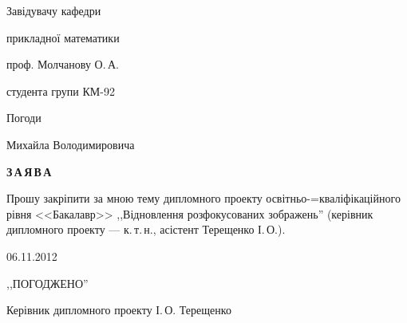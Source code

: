 \documentclass[a4paper,12pt,notitlepage,headsepline,pdftex]{scrartcl}
\begin{document}
\begin{titlepage}
  \hfill
  \begin{minipage}{0.4\textwidth}
    Завідувачу кафедри

    прикладної математики

    проф. Молчанову О.\,А.

    \vspace{0.3cm}

    студента групи КМ-92

    Погоди

    Михайла Володимировича
  \end{minipage}

  \vspace{3cm}
  \begin{center}
    \bf
    З\,А\,Я\,В\,А
  \end{center}

  \vspace{1cm}

  Прошу закріпити за мною тему дипломного проекту освітньо-=кваліфікаційного
  рівня <<Бакалавр>> ,,Відновлення розфокусованих зображень'' (керівник
  дипломного проекту --- к.\,т.\,н., асістент Терещенко І.\,О.).

  \vspace{1cm}

  \hspace{1cm}06.11.2012

  \hfill\underline{\hspace{2cm}}\hspace{1cm}

  \vspace{5cm}

  ,,ПОГОДЖЕНО''

  \vspace{0.5cm}

  Керівник дипломного проекту\hfill\underline{\hspace{2cm}}\hspace{1cm} І.\,О.
  Терещенко

\end{titlepage}
\end{document}
